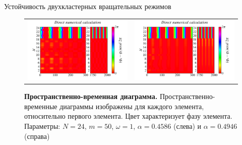 \begin{chapter}{Устойчивость двухкластерных вращательных режимов}
	\begin{figure}[h!]\center
		\begin{tabular}{cc}
		\includegraphics[width=0.5\columnwidth]{pictures/Figure_M_50_A_0.4586_O_1.png}
		&
		\includegraphics[width=0.5\columnwidth]{pictures/Figure_M_50_A_0.4946_O_1.png}
		\end{tabular}
		\caption{\textbf{Пространственно-временная диаграмма.}
		Пространственно-временные диаграммы изображены для каждого элемента, относительно первого элемента.
		Цвет характеризует фазу элемента. Параметры: $N=24$, $m = 50$, $\omega = 1$, $\alpha = 0.4586$ (слева) и $\alpha = 0.4946$ (справа)}
	\end{figure}


	
	

\end{chapter}
